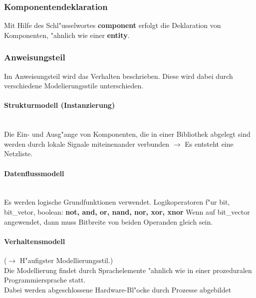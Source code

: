 		\subsubsection{Komponentendeklaration}
			Mit Hilfe des Schl"usselwortes \textbf{component} erfolgt die Deklaration von 
			Komponenten, "ahnlich wie einer \textbf{entity}.\\
			
			
		\subsubsection{Anweisungsteil}
			Im Anweisungsteil wird das Verhalten beschrieben. Diese wird dabei 		
			durch verschiedene Modelierungsstile unterschieden.
			\paragraph{Strukturmodell (Instanzierung)} $\;$ \\
				Die Ein- und Ausg"ange von Komponenten, die 
				in einer Bibliothek abgelegt sind werden durch lokale Signale miteinenander 
				verbunden $\rightarrow$ Es entsteht eine Netzliste. 
				\begin{multicols}{2}
					
				\end{multicols}
			\paragraph{Datenflussmodell} $\;$ \\
				Es werden logische Grundfunktionen verwendet.
				Logikoperatoren f"ur bit, bit\_vetor, boolean: \textbf{not, and, or, nand, nor,
 				xor, xnor	} Wenn auf bit\_vector angewendet, dann muss Bitbreite von 
				beiden Operanden gleich sein.
				\begin{multicols}{2}
					
				\end{multicols}
			\paragraph{Verhaltensmodell} ($\rightarrow$ H"aufigster Modellierungsstil.) \\
				Die Modellierung findet durch Sprachelemente "ahnlich wie in einer 	
				prozeduralen Programmiersprache statt.\\
				Dabei werden abgeschlossene Hardware-Bl"ocke durch Prozesse 
				abgebildet\\
				

